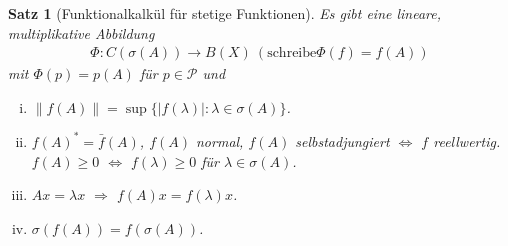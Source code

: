\documentclass[12pt,a4paper,titlepage]{scrartcl}
\newtheorem{Satz}{Satz}[subsection]
\numberwithin{equation}{section}
\begin{document}
	
	\begin{Satz}[Funktionalkalkül für stetige Funktionen]
		Es gibt eine lineare, multiplikative Abbildung 
		\begin{align*}
			\Phi: C(\sigma(A)) \rightarrow B(X) ~(\text{schreibe} \Phi(f) = f(A))
		\end{align*}
		mit $\Phi(p) = p(A)$ für $p\in \mathcal{P}$ und
		\begin{enumerate}[(i)]
			\item $\|f(A)\| = \sup\{|f(\lambda)|: \lambda\in \sigma(A) \}$.
			\item $f(A)^* = \bar{f}(A)$, $f(A)$ normal, $f(A)$ selbstadjungiert $\Leftrightarrow$ $f$ reellwertig. $f(A)\geq 0$ $\Leftrightarrow$ $f(\lambda)\geq 0$ für $\lambda\in \sigma(A)$.
			\item $Ax = \lambda x$ $\Rightarrow$ $f(A)x = f(\lambda)x$.
			\item $\sigma(f(A)) = f(\sigma(A))$.
		\end{enumerate}
	\end{Satz}
	
\end{document}

